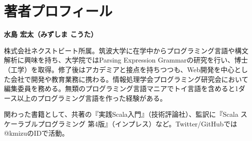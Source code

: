 \hypertarget{author-ux8457ux8005ux30d7ux30edux30d5ux30a3ux30fcux30eb}{%
\chapter*{著者プロフィール}\label{author-ux8457ux8005ux30d7ux30edux30d5ux30a3ux30fcux30eb}}

\noindent
\textbf{水島 宏太（みずしま こうた）}

株式会社ネクストビート所属。筑波大学に在学中からプログラミング言語や構文解析に興味を持ち、大学院ではParsing Expression Grammarの研究を行い、博士（工学）を取得。修了後はアカデミアと接点を持ちつつも、Web開発を中心とした会社で開発や教育業務に携わる。情報処理学会プログラミング研究会において編集委員を務める。無類のプログラミング言語マニアでトイ言語を含めると1ダース以上のプログラミング言語を作った経験がある。

関わった書籍として、共著の『実践Scala入門』（技術評論社）、監訳に『Scala スケーラブルプログラミング 第4版』（インプレス）など。Twitter/GitHubでは@kmizuのIDで活動。
